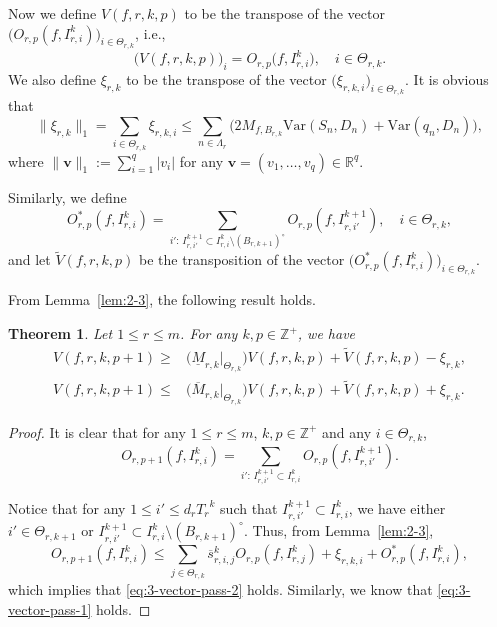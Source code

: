 \documentclass[11pt]{amsart}
\newtheorem{thm}{Theorem}[section]
\theoremstyle{definition}
\theoremstyle{remark}
\numberwithin{equation}{section}
\newcommand{\bR}{{\mathbb R}}
\newcommand{\Z}{{\mathbb Z}}
\newcommand{\bfv}{{\mathbf v}}
\newcommand{\upM}{{\overline{M}}}
\newcommand{\lowM}{{\underline{M}}}
\newcommand{\ups}{{\overline{s} }}
\newcommand{\Var}{\mathrm{Var}}
\begin{document}


Now we define $V(f,r,k,p)$ to be the transpose of the vector $\big(O_{r,p}(f,I_{r,i}^k)\big)_{i\in \Theta_{r,k}}$, i.e., 
\[
\big(V(f,r,k,p)\big)_i=O_{r,p}(f,I_{r,i}^k\big), \quad i\in \Theta_{r,k}.
\]
We also define $\xi_{r,k}$ to be the transpose of the vector $\big(\xi_{r,k,i}\big)_{i\in \Theta_{r,k}}$. It is obvious that
\begin{equation}\label{eq:xiup}
	\lVert \xi_{r,k}\rVert_1 = \sum_{i\in\Theta_{r,k}}  \xi_{r,k,i} \leq\sum_{n \in \Lambda_r}\Big(2M_{f,B_{r,k}} \Var (S_n,D_n)+\Var(q_n,D_n)\Big),
\end{equation}
where $\lVert \bfv\rVert_1:=\sum_{i=1}^q |v_i|$ for any $\bfv=(v_1,\ldots,v_q)\in \bR^q$.

Similarly, we define 
\[
  O_{r,p}^*(f,I_{r,i}^k)=\sum_{i':\, I_{r,i'}^{k+1}\subset I_{r,i}^k\setminus (B_{r,k+1})^{\circ}} O_{r,p}(f,I_{r,i'}^{k+1}), \quad i\in \Theta_{r,k},
\]
and let $\widetilde{V}(f,r,k,p)$ be the transposition of the vector $\big(O_{r,p}^*(f,I_{r,i}^k)\big)_{i\in \Theta_{r,k}}$. 



From Lemma~\ref{lem:2-3}, the following result holds.
\begin{thm}\label{thm:vsm-pass-tmp}
	Let $1 \leq r \leq m$. For any $k,p \in \mathbb{Z}^+$, we have
	\begin{align}
		V(f,r,k,p+1) \geq &\big(\lowM_{r,k}|_{\Theta_{r,k}}\big) V(f,r,k,p) +\widetilde{V}(f,r,k,p)  -\xi_{r,k},\label{eq:3-vector-pass-1}\\
		V(f,r,k,p+1) \leq &\big(\upM_{r,k}|_{\Theta_{r,k}}\big)  V(f,r,k,p)+ \widetilde{V}(f,r,k,p)+\xi_{r,k}.\label{eq:3-vector-pass-2}
	\end{align}
\end{thm}
\begin{proof}
	It is clear that for any $1\leq r\leq m$, $k,p\in \Z^+$ and any $i\in \Theta_{r,k}$, 
	\[
	O_{r,p+1}(f,I_{r,i}^k)=\sum_{i':\, I_{r,i'}^{k+1} \subset I_{r,i}^k} O_{r,p}(f,I_{r,i'}^{k+1}).
	\]
	
	
	Notice that for any $1 \leq i' \leq d_r {T_r}^k$ such that $I_{r,i'}^{k+1} \subset I_{r,i}^k$, we have either $ i' \in \Theta_{r,k+1}$ or $I_{r,i'}^{k+1}\subset I_{r,i}^k\setminus (B_{r,k+1})^\circ$.	Thus, from Lemma~\ref{lem:2-3}, 
	\[
	  O_{r,p+1}(f,I_{r,i}^k)\leq \sum_{j\in\Theta_{r,k}} \ups_{r,i,j}^k O_{r,p}(f,I_{r,j}^k)+\xi_{r,k,i} + O_{r,p}^*(f,I_{r,i}^k),
	\]
	which implies that \eqref{eq:3-vector-pass-2} holds. Similarly, we know that \eqref{eq:3-vector-pass-1} holds.
\end{proof}
\end{document}
